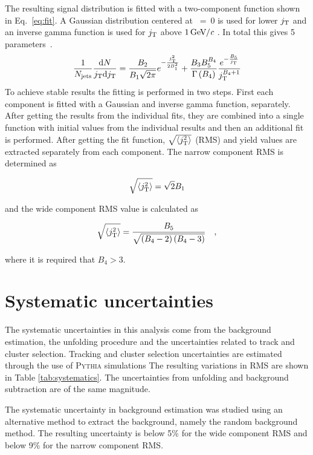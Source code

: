 The resulting signal distribution is fitted with a two-component function shown in Eq.~\ref{eq:fit}. 
A Gaussian distribution centered at \jt~=~0 is used for lower $j_{\rm T}$ and an inverse gamma function is used for $j_{\rm T}$ above $\unit[1]{\GeVc}$ . In total this gives 5 parameters~\cite{ALICEjt}. 
\begin{equation}
\frac{1}{N_{\mathrm{jets}}}\frac{\mathrm{d}N}{j_{\rm T} \mathrm{d}j_{\rm T}} = \frac{B_2}{B_1\sqrt{2\pi}}e^{-\frac{j_{\rm T}^2}{2B_1^2}}+\frac{B_3B_5^{B_4}}{\Gamma\left(B_4\right)}\frac{e^{-\frac{B_5}{j_{\rm T}}}}{j_{\rm T}^{B_4+1}}
\label{eq:fit}
\end{equation}
To achieve stable results the fitting is performed in two steps. First each component is fitted with a Gaussian and inverse gamma function, separately. After getting the results from the individual fits,  they are combined into a single function with initial values from the individual results and then an additional fit is performed. 
After getting the fit function, $\sqrt{\left<j_{\rm T}^2\right>}$ (RMS) and yield values are  extracted separately from each component. The narrow component RMS is determined as

$$\sqrt{\left<j_{\rm T}^2\right>}=\sqrt{2}B_1$$

and the wide component RMS value is calculated as

$$\sqrt{\left<j_{\rm T}^2\right>}=\frac{B_5}{\sqrt{\left(B_4-2\right)\left(B_4-3\right)}}\quad,$$

where it is required that $B_4 > 3$.

\section{Systematic uncertainties}
\label{sec:systematicerrors}
The systematic uncertainties in this analysis come from the background estimation, the unfolding procedure and the uncertainties related to track and cluster selection. Tracking and cluster selection uncertainties are estimated through the use of \textsc{Pythia} simulations The resulting variations in RMS are shown in Table \ref{tab:systematics}. The uncertainties from unfolding and background subtraction are of the same magnitude.

The systematic uncertainty in background estimation was studied using an alternative method to extract the background, namely the random background method. The resulting uncertainty is below 5\% for the wide component RMS and below 9\% for the narrow component RMS.

